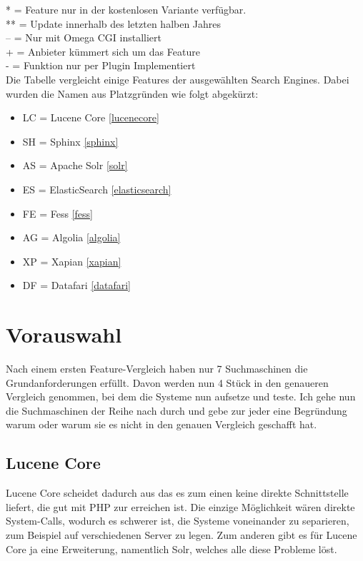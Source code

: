 \begin{table}
    *  = Feature nur in der kostenlosen Variante verfügbar. \\
    ** = Update innerhalb des letzten halben Jahres \\
    -- = Nur mit Omega CGI installiert \\
    +  = Anbieter kümmert sich um das Feature \\
    -  = Funktion nur per Plugin Implementiert \\

    Die Tabelle vergleicht einige Features der ausgewählten Search Engines. Dabei wurden die Namen aus Platzgründen wie folgt abgekürzt:

    \begin{itemize}
        \item LC = Lucene Core \ref{lucenecore}
        \item SH = Sphinx \ref{sphinx}
        \item AS = Apache Solr \ref{solr}
        \item ES = ElasticSearch \ref{elasticsearch}
        \item FE = Fess \ref{fess}
        \item AG = Algolia \ref{algolia}
        \item XP = Xapian \ref{xapian}
        \item DF = Datafari \ref{datafari}
    \end{itemize} 


\end{table}

\section{Vorauswahl}

Nach einem ersten Feature-Vergleich haben nur 7 Suchmaschinen die Grundanforderungen erfüllt. Davon werden nun 4 Stück in den genaueren Vergleich genommen, bei dem die Systeme nun aufsetze und teste. Ich gehe nun die Suchmaschinen der Reihe nach durch und gebe zur jeder eine Begründung warum oder warum sie es nicht in den genauen Vergleich geschafft hat.

\subsection{Lucene Core}

Lucene Core scheidet dadurch aus das es zum einen keine direkte Schnittstelle liefert, die gut mit PHP zur erreichen ist. Die einzige Möglichkeit wären direkte System-Calls, wodurch es schwerer ist, die Systeme voneinander zu separieren, zum Beispiel auf verschiedenen Server zu legen. Zum anderen gibt es für Lucene Core ja eine Erweiterung, namentlich Solr, welches alle diese Probleme löst. \cite{TheApacheSoftwareFoundation.2019b}

